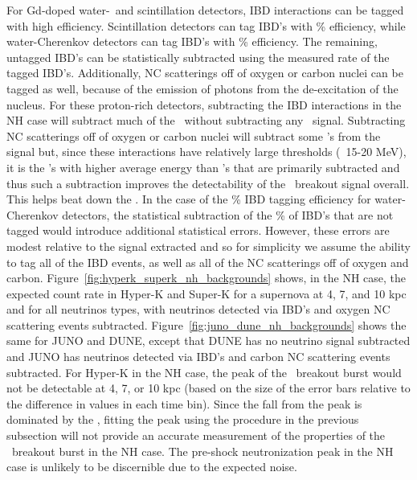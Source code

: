 For Gd-doped water-\cer\ and scintillation detectors, IBD interactions
    can be tagged with high efficiency.  Scintillation detectors can
    tag IBD's with \% 
    efficiency, while water-Cherenkov detectors can tag IBD's with
    \% efficiency.  The 
    remaining, untagged IBD's can be statistically subtracted using the measured rate of 
    the tagged IBD's.  Additionally, NC scatterings off of oxygen or carbon nuclei can be 
    tagged as well, because of the emission of photons from the de-excitation of the nucleus.  
    For these proton-rich detectors, subtracting the IBD interactions in the NH case will 
    subtract much of the \background\ without subtracting any \nue\ 
    signal.  Subtracting NC scatterings off of oxygen or carbon nuclei will subtract some 
    \nue's from the signal but, since these interactions have relatively large thresholds  
    (~15-20 MeV), it is the \nux's with higher average energy than \nue's that are 
    primarily subtracted and thus such a subtraction improves the detectability of the \nue\ 
    breakout signal overall.  This helps beat down the \backgrounds.  In 
    the case of the \abt 90\% IBD tagging efficiency for water-Cherenkov detectors, the 
    statistical subtraction of the \abt 10\% of IBD's that are not tagged would introduce 
    additional statistical errors.  However, these errors are modest relative to the signal 
    extracted and so for simplicity we assume the ability to tag all of the IBD events, as well 
    as all of the NC scatterings off of oxygen and carbon.
Figure~\ref{fig:hyperk_superk_nh_backgrounds}
shows, in the NH case, the expected count rate in Hyper-K and Super-K 
for a supernova at 4, 7, and
10 kpc and for all neutrinos types, with
neutrinos detected via IBD's and oxygen NC scattering events
subtracted.
Figure~\ref{fig:juno_dune_nh_backgrounds} shows the same for JUNO and
DUNE, except that DUNE has no neutrino signal subtracted and JUNO has
neutrinos detected via IBD's and carbon NC scattering events subtracted.
For Hyper-K in the NH case, the peak of the \nue\ breakout burst 
would not be detectable at 4, 7, or 10 kpc (based on the
size of the error bars relative to the difference in values in each
time bin).  Since 
the fall from the peak is dominated by the 
\backgrounds, fitting the
peak using the procedure in the previous subsection will not
provide an accurate measurement of the properties of the \nue\
breakout burst in the NH case.  The
pre-shock neutronization peak in the NH case is unlikely to be 
discernible due to the expected noise.  

